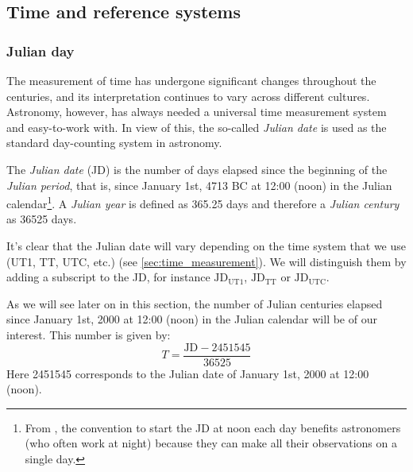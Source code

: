 \documentclass[../main.tex]{subfiles}
\begin{document}
\subsection{Time and reference systems}
\subsubsection{Julian day}\label{sec:julian_day}
The measurement of time has undergone significant changes throughout the centuries, and its interpretation continues to vary across different cultures. Astronomy, however, has always needed a universal time measurement system and easy-to-work with. In view of this, the so-called \emph{Julian date} is used as the standard day-counting system in astronomy.
\begin{definition}
  The \emph{Julian date} (JD) is the number of days elapsed since the beginning of the \emph{Julian period}, that is, since January 1st, 4713 BC at 12:00 (noon) in the Julian calendar\footnote{From \cite{vallado}, the convention to start the JD at noon each day benefits astronomers (who often work at night) because they can make all their observations on a single day.}. A \emph{Julian year} is defined as 365.25 days and therefore a \emph{Julian century} as 36525 days.
\end{definition}
It's clear that the Julian date will vary depending on the time system that we use (UT1, TT, UTC, etc.) (see \cref{sec:time_measurement}). We will distinguish them by adding a subscript to the JD, for instance $\text{JD}_\mathrm{UT1}$, $\text{JD}_\mathrm{TT}$ or $\text{JD}_\mathrm{UTC}$.

As we will see later on in this section, the number of Julian centuries elapsed since January 1st, 2000 at 12:00 (noon) in the Julian calendar will be of our interest. This number is given by:
\begin{equation}
  T = \frac{\text{JD}-2451545}{36525}
\end{equation}
Here 2451545 corresponds to the Julian date of January 1st, 2000 at 12:00 (noon).
\end{document}
